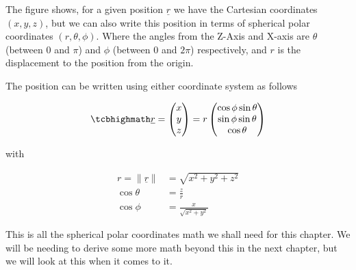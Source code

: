 The figure shows, for a given position $\underline{r}$ we have the Cartesian coordinates $({x},{y},{z})$, but we can also write this position in terms of spherical polar coordinates $(r,\theta,\phi)$.
Where the angles from the Z-Axis and X-axis are $\theta$ (between 0 and $\pi$) and $\phi$ (between 0 and $2\pi$) respectively, and ${r}$ is the displacement to the position from the origin.

The position can be written using either coordinate system as follows

\begin{equation}
	\label{eq: cartesian to spherical polar coordinates}
	\mhl{
		\underline{r} =
		\begin{pmatrix}
			x \\
			y \\
			z \\
		\end{pmatrix}
		= r
		\begin{pmatrix}
			\cos{\phi}\sin{\theta} \\
			\sin{\phi}\sin{\theta} \\
			\cos{\theta}           \\
		\end{pmatrix}
	}
\end{equation}

with

\begin{equation}
	\begin{aligned}
		r = \|\underline{r}\| & =\sqrt{x^2 + y^2 + z^2}      \\
		\cos\theta            & = \frac{z}{r}                \\
		\cos\phi              & = \frac{x}{\sqrt{x^2 + y^2}}
	\end{aligned}
\end{equation}

This is all the spherical polar coordinates math we shall need for this chapter.
We will be needing to derive some more math beyond this in the next chapter, but we will look at this when it comes to it.


